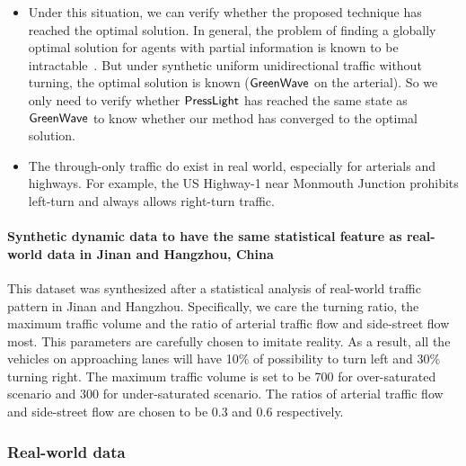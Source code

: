 \begin{itemize}
\item Under this situation, we can verify whether the proposed technique has reached the optimal solution. In general, the problem of finding a globally optimal solution for agents with partial information is known to be intractable~\cite{bernstein2002complexity}. But under synthetic uniform unidirectional traffic without turning, the optimal solution is known ($\textsf{GreenWave}$ on the arterial). So we only need to verify whether $\textsf{PressLight}$ has reached the same state as $\textsf{GreenWave}$ to know whether our method has converged to the optimal solution.
\item The through-only traffic do exist in real world, especially for arterials and highways. For example, the US Highway-1 near Monmouth Junction prohibits left-turn and always allows right-turn traffic.
\end{itemize}

\paragraph{Synthetic dynamic data to have the same statistical feature as real-world data in Jinan and Hangzhou, China} This dataset was synthesized after a statistical analysis of real-world traffic pattern in Jinan and Hangzhou. Specifically, we care the turning ratio, the maximum traffic volume and the ratio of arterial traffic flow and side-street flow most. This parameters are carefully chosen to imitate reality. As a result, all the vehicles on approaching lanes  will have 10\% of possibility to turn left and 30\% turning right. The maximum traffic volume is set to be 700 for over-saturated scenario and 300 for under-saturated scenario. The ratios of arterial traffic flow and side-street flow are chosen to be 0.3 and 0.6 respectively.


\subsubsection{Real-world data}

